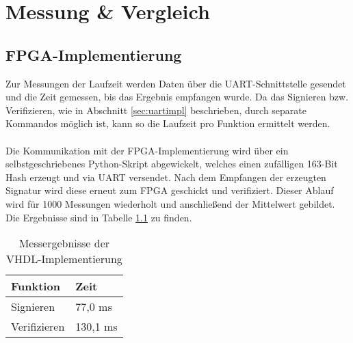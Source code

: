 
\chapter{Messung \& Vergleich} \label{sec:messung}

\section{FPGA-Implementierung}
Zur Messungen der Laufzeit werden Daten über die UART-Schnittstelle gesendet und die Zeit gemessen, bis das Ergebnis empfangen wurde. Da das Signieren bzw. Verifizieren, wie in Abschnitt \ref{sec:uartimpl} beschrieben, durch separate Kommandos möglich ist, kann so die Laufzeit pro Funktion ermittelt werden. 
\\ \\
Die Kommunikation mit der FPGA-Implementierung wird über ein selbstgeschriebenes Python-Skript abgewickelt, welches einen zufälligen 163-Bit Hash erzeugt und via UART versendet. Nach dem Empfangen der erzeugten Signatur wird diese erneut zum FPGA geschickt und verifiziert. Dieser Ablauf wird für 1000 Messungen wiederholt und anschließend der Mittelwert gebildet. Die Ergebnisse sind in Tabelle \ref{vhdl-messung} zu finden.
\\
\begin{table}[h]
	\centering 
	\begin{tabular}{ | p{3cm} | p{6cm} | }
		\hline
		\textbf{Funktion} & \textbf{Zeit} \\
		\hline
		Signieren & 77,0 ms \\
		\hline
		Verifizieren & 130,1 ms \\
		\hline
	\end{tabular}
	\caption{Messergebnisse der VHDL-Implementierung}
	\label{vhdl-messung}
\end{table}

